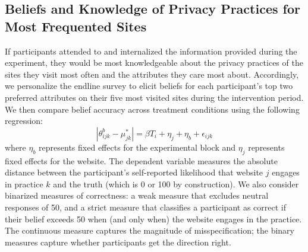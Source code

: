 \documentclass[12pt]{article}
\theoremstyle{definition}
\theoremstyle{remark}
\begin{document}
\subsection{Beliefs and Knowledge of Privacy Practices for Most Frequented Sites}\label{sec:knowledge_top_sites}

If participants attended to and internalized the information provided during the experiment, they would be most knowledgeable about the privacy practices of the sites they visit most often and the attributes they care most about. Accordingly, we personalize the endline survey to elicit beliefs for each participant's top two preferred attributes on their five most visited sites during the intervention period. We then compare belief accuracy across treatment conditions using the following regression:
$$|\theta^b_{ijk} - \mu^*_{jk}| = \beta T_i + \eta_j + \eta_b + \epsilon_{ijk}$$
where $\eta_b$ represents fixed effects for the experimental block and $\eta_j$ represents fixed effects for the website. The dependent variable measures the absolute distance between the participant's self-reported likelihood that website $j$ engages in practice $k$ and the truth (which is 0 or 100 by construction). We also consider binarized measures of correctness: a weak measure that excludes neutral responses of 50, and a strict measure that classifies a participant as correct if their belief exceeds 50 when (and only when) the website engages in the practice. The continuous measure captures the magnitude of misspecification; the binary measures capture whether participants get the direction right.

\begin{table}[ht]
   \caption{Belief Correctness on Top Sites -- Provided Information}\label{tab:belief_correctness_top_sites}
   \centering
   \scalebox{0.8}{
   
   }
   \caption*{\scriptsize \textsc{Notes}:  OLS estimates from Equation (3). Includes website and randomization block fixed effects. Column (1): Dependent variable is $|\text{Belief}_{ijk} - \text{Truth}_{jk}|$, where beliefs are scaled to $\{0, 25, 50, 75, 100\}$ and truth is binary $\{0, 100\}$. Column (2): Binary indicator equal to 1 if response is correct, excluding neutral responses of 50. Column (3): Strict correctness, equal to 1 if $(\text{Belief} > 50) = (\text{Truth} = 100)$. The beliefs are the likelihood of the website engaging in the specified privacy practice for the top 5 most visited sites during the intervention and for the top 2 most informative attributes according to Equation \eqref{eq:provided_info}.}
\end{table}
\end{document}
